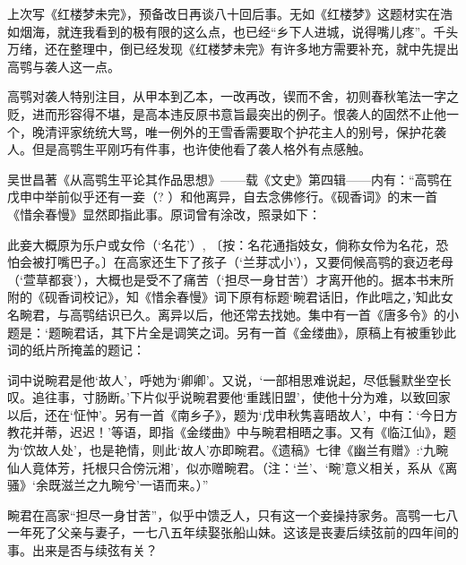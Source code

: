 \par 上次写《红楼梦未完》，预备改日再谈八十回后事。无如《红楼梦》这题材实在浩如烟海，就连我看到的极有限的这么点，也已经“乡下人进城，说得嘴儿疼”。千头万绪，还在整理中，倒已经发现《红楼梦未完》有许多地方需要补充，就中先提出高鹗与袭人这一点。
\par 高鹗对袭人特别注目，从甲本到乙本，一改再改，锲而不舍，初则春秋笔法一字之贬，进而形容得不堪，是高本违反原书意旨最突出的例子。恨袭人的固然不止他一个，晚清评家统统大骂，唯一例外的王雪香需要取个护花主人的别号，保护花袭人。但是高鹗生平刚巧有件事，也许使他看了袭人格外有点感触。
\par 吴世昌著《从高鹗生平论其作品思想》——载《文史》第四辑——内有：“高鹗在戊申中举前似乎还有一妾（? ）和他离异，自去念佛修行。《砚香词》的末一首《惜余春慢》显然即指此事。原词曾有涂改，照录如下：
\par 此妾大概原为乐户或女伶（‘名花’）, 〔按：名花通指妓女，倘称女伶为名花，恐怕会被打嘴巴子。〕在高家还生下了孩子（‘兰芽忒小’），又要伺候高鹗的衰迈老母（‘萱草都衰’），大概也是受不了痛苦（‘担尽一身甘苦’）才离开他的。据本书末所附的《砚香词校记》，知《惜余春慢》词下原有标题‘畹君话旧，作此唁之，’知此女名畹君，与高鹗结识已久。离异以后，他还常去找她。集中有一首《唐多令》的小题是：‘题畹君话，其下片全是调笑之词。另有一首《金缕曲》，原稿上有被重钞此词的纸片所掩盖的题记：
\par 词中说畹君是他‘故人’，呼她为‘卿卿’。又说，‘一部相思难说起，尽低鬟默坐空长叹。追往事，寸肠断。’下片似乎说畹君要他‘重践旧盟’，使他十分为难，以致回家以后，还在‘怔忡’。另有一首《南乡子》，题为‘戊申秋隽喜晤故人’，中有：‘今日方教花并蒂，迟迟！’等语，即指《金缕曲》中与畹君相晤之事。又有《临江仙》，题为‘饮故人处’，也是艳情，则此‘故人’亦即畹君。《遗稿》七律《幽兰有赠》:‘九畹仙人竟体芳，托根只合傍沅湘’，似亦赠畹君。（注：‘兰’、‘畹’意义相关，系从《离骚》‘余既滋兰之九畹兮’一语而来。）”
\par 畹君在高家“担尽一身甘苦”，似乎中馈乏人，只有这一个妾操持家务。高鹗一七八一年死了父亲与妻子，一七八五年续娶张船山妹。这该是丧妻后续弦前的四年间的事。出来是否与续弦有关？
